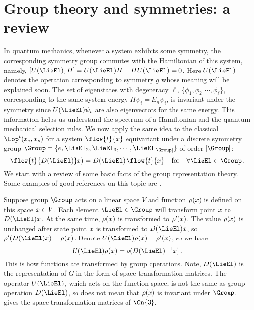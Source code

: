 
\section{Group theory and symmetries: a review}
\label{sect:group}

In quantum mechanics, whenever a system exhibits some symmetry, the
corresponding symmetry group commutes with the Hamiltonian of this
system, namely, $[U(\LieEl), H] = U(\LieEl)H - HU(\LieEl) = 0$. Here
$U(\LieEl)$ denotes the operation corresponding to symmetry $g$ whose
meaning will be explained soon. The set of eigenstates with degeneracy
$\ell$, $\{\phi_1, \phi_2, \cdots, \phi_\ell\}$, corresponding to the same
system energy $H\psi_i = E_n\psi_i$, is invariant under the symmetry
since $U(\LieEl)\psi_i$ are also eigenvectors for the same energy.
This information helps us understand the spectrum of a Hamiltonian and
the quantum mechanical selection rules. We now apply the same idea to
the classical {\evOper} $\Lop^t(\ssp_e, \ssp_s)$
for a system $\flow{t}{\ssp}$ equivariant under a discrete symmetry group
$\Group=\{e, \LieEl_2, \LieEl_3,\cdots, \LieEl_{|\Group|}\}$ of order
$|\Group|$:
\begin{equation}
  \label{eq:equiva}
  \flow{t}{{D}(\LieEl)}\ssp)={D}(\LieEl)\,\flow{t}{\ssp} \quad \text{for}
  \quad \forall
  \LieEl\in\Group
  \,.
\end{equation}
We start with a review of some basic facts of
the group representation theory. Some examples of good references
on this topic are .

Suppose group $\Group$ acts on a linear space $V$ and function
$\rho(x)$ is defined on this space $x\in V$. Each element
$\LieEl\in\Group$ will transform point $x$ to ${D}(\LieEl)\ssp$. At
the same time, $\rho(x)$ is transformed to $\rho'(x)$. The value
$\rho(x)$ is unchanged after state point $x$ is transformed to
${D}(\LieEl)\ssp$, so $\rho'({D}(\LieEl)\ssp) = \rho(\ssp)$. Denote
$U(\LieEl)\rho(\ssp)=\rho'(\ssp)$, so we have
\begin{equation}
  \label{eq:ogfx}
  U(\LieEl)\rho(\ssp) = \rho({D}(\LieEl)^{-1}\ssp)
  \,.
\end{equation}
This is how functions are transformed by group operations. Note, $D(\LieEl)$
is the representation of $G$ in the form of space transformation matrices.
The
operator $U(\LieEl)$, which acts on the function space, is not the same as
group operation ${D}(\LieEl)$, so  does not mean that
$\rho(x)$ is invariant under $\Group$.  gives
the space transformation matrices of $\Cn{3}$.

